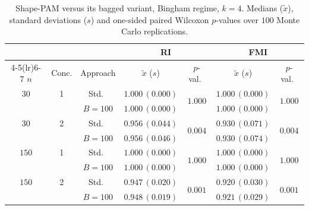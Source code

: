 \begin{table}[h]
\centering
\caption{Shape-PAM versus its bagged variant, Bingham regime, $k=4$. Medians ($\tilde x$), standard deviations ($s$) and one-sided paired Wilcoxon $p$-values over $100$ Monte Carlo replications.}
\label{tab:pam-bing-k4}
\footnotesize
\begin{tabular}{cc c cc cc}
\toprule
& & & \multicolumn{2}{c}{\textbf{RI}} & \multicolumn{2}{c}{\textbf{FMI}} \\
\cmidrule(lr){4-5}\cmidrule(lr){6-7}
$n$ & Conc. & Approach & $\tilde x$ ($s$) & $p$-val.\ & $\tilde x$ ($s$) & $p$-val.\ \\
\midrule
$30$ & 1 & Std.\ & $1.000\,(0.000)$ & \multirow{2}{*}{$1.000$} & $1.000\,(0.000)$ & \multirow{2}{*}{$1.000$} \\
     &   & $B{=}100$ & $1.000\,(0.000)$ & & $1.000\,(0.000)$ & \\
$30$ & 2 & Std.\ & $0.956\,(0.044)$ & \multirow{2}{*}{$\mathbf{0.004}$} & $0.930\,(0.071)$ & \multirow{2}{*}{$\mathbf{0.004}$} \\
     &   & $B{=}100$ & $0.956\,(0.046)$ & & $0.930\,(0.074)$ & \\
$150$ & 1 & Std.\ & $1.000\,(0.000)$ & \multirow{2}{*}{$1.000$} & $1.000\,(0.000)$ & \multirow{2}{*}{$1.000$} \\
     &   & $B{=}100$ & $1.000\,(0.000)$ & & $1.000\,(0.000)$ & \\
$150$ & 2 & Std.\ & $0.947\,(0.020)$ & \multirow{2}{*}{$\mathbf{0.001}$} & $0.920\,(0.030)$ & \multirow{2}{*}{$\mathbf{0.001}$} \\
     &   & $B{=}100$ & $0.948\,(0.019)$ & & $0.921\,(0.029)$ & \\
\bottomrule
\end{tabular}
\end{table}

